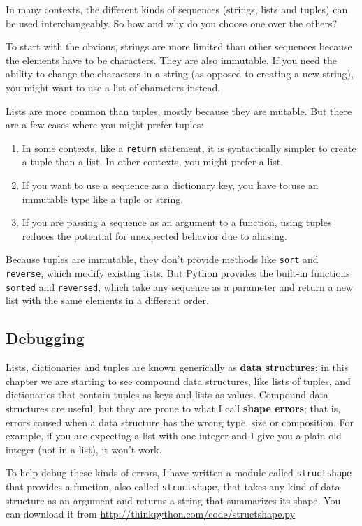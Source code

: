 \documentclass{article}
\begin{document}
In many contexts, the different kinds of sequences (strings, lists and
tuples) can be used interchangeably. So how and why do you choose one
over the others?

To start with the obvious, strings are more limited than other
sequences because the elements have to be characters. They are also
immutable. If you need the ability to change the characters in a
string (as opposed to creating a new string), you might want to use a
list of characters instead.

Lists are more common than tuples, mostly because they are mutable.
But there are a few cases where you might prefer tuples:
\begin{enumerate}
    \item In some contexts, like a \verb|return| statement,
        it is syntactically simpler to create a tuple than a list.
        In other contexts, you might prefer a list.
    \item If you want to use a sequence as a dictionary key, you have
        to use an immutable type like a tuple or string.
    \item If you are passing a sequence as an argument to a function,
        using tuples reduces the potential for unexpected behavior due
        to aliasing.
\end{enumerate}
Because tuples are immutable, they don’t provide methods like \verb|sort|
and \verb|reverse|, which modify existing lists. But Python provides the
built-in functions \verb|sorted| and \verb|reversed|, which take any
sequence as a parameter and return a new list with the same elements in
a different order.

\subsection{Debugging}
Lists, dictionaries and tuples are known generically as
\textbf{data structures}; in this chapter we are starting to see
compound data structures, like lists of tuples, and dictionaries that
contain tuples as keys and lists as values. Compound data structures are useful, but
they are prone to what I call \textbf{shape errors}; that is, errors caused
when a data structure has the wrong type, size or composition. For
example, if you are expecting a list with one integer and I give you a
plain old integer (not in a list), it won’t work.

To help debug these kinds of errors, I have written a module called
\verb|structshape| that provides a function, also called \verb|structshape|,
that takes any kind of data structure as an argument and returns a string
that summarizes its shape. You can download it from
\url{http://thinkpython.com/code/structshape.py}
\end{document}
